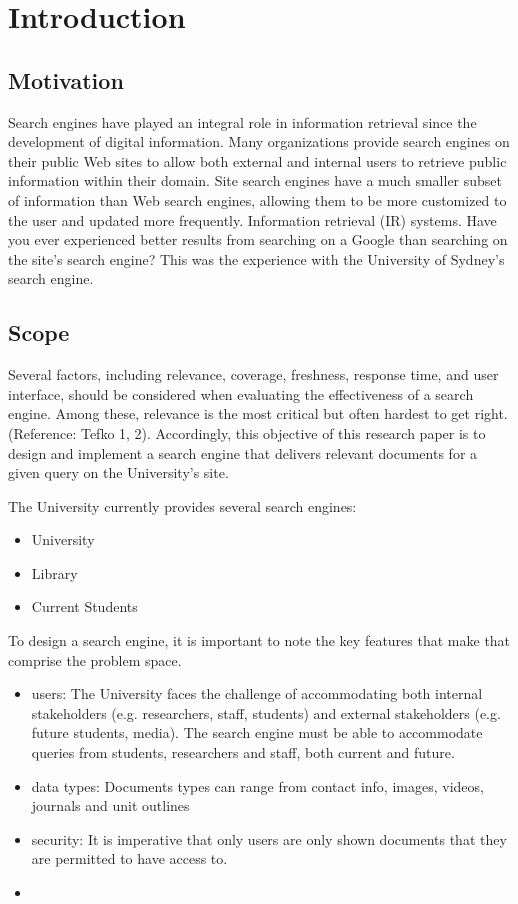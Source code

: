 \chapter{Introduction}\label{cha:introduction}
\section{Motivation} 
Search engines have played an integral role in information retrieval since the development of digital information. Many organizations provide search engines on their public Web sites to allow both external and internal users to retrieve public information within their domain. Site search engines have a much smaller subset of information than Web search engines, allowing them to be more customized to the user and updated more frequently. Information retrieval (IR) systems. Have you ever experienced better results from searching on a Google than searching on the site's search engine? This was the experience with the University of Sydney's search engine. 



\section{Scope}
Several factors, including relevance, coverage, freshness, response time, and user interface, should be considered when evaluating the effectiveness of a search engine. Among these, relevance is the most critical but often hardest to get right. (Reference: Tefko 1, 2). Accordingly, this objective of this research paper is to design and implement a search engine that delivers relevant documents for a given query on the University's site.

The University currently provides several search engines:
\begin{itemize}
    \item University
    \item Library
    \item Current Students
\end{itemize}

To design a search engine, it is important to note the key features that make that comprise the problem space. 
\begin{itemize}
    \item users: The University faces the challenge of accommodating both internal stakeholders (e.g. researchers, staff, students) and external stakeholders (e.g. future students, media). The search engine must be able to accommodate queries from students, researchers and staff, both current and future.
    \item data types: Documents types can range from contact info, images, videos, journals and unit outlines
    \item security: It is imperative that only users are only shown documents that they are permitted to have access to.
    \item 
\end{itemize}

